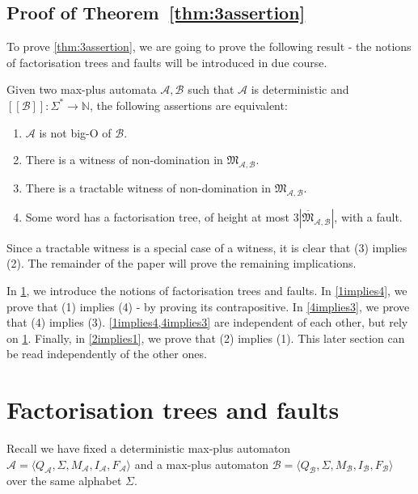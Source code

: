 \documentclass{lmcs}
\theoremstyle{remark}
\newcommand{\N}{\mathbb{N}}
\newcommand{\ideal}{\mathfrak{M}}
\newcommand{\autA}{\mathcal{A}}
\newcommand{\autB}{\mathcal{B}}
\newcommand{\brfunc}[1]{[\![#1]\!]}
\newcommand{\funcB}{\brfunc{\autB}}
\theoremstyle{remark}
\begin{document}
\subsection{Proof of Theorem~\ref{thm:3assertion}}

To prove \cref{thm:3assertion}, we are going to prove the following result - the notions of factorisation trees and faults will be introduced in due course.

\begin{thm}\label{thm:4assertion}
Given two max-plus automata $\autA,\autB$ such that $\autA$ is deterministic and $\funcB:\Sigma^* \to \N$, the following assertions are equivalent:
\begin{enumerate}[label={\normalfont(\arabic*)}]
\item $\autA$ is not big-O of $\autB$.
\item There is a witness of non-domination in $\ideal_{\autA,\autB}$.
\item There is a tractable witness of non-domination in $\ideal_{\autA,\autB}$.
\item Some word has a factorisation tree, of height at most $3|\overline{\ideal}_{\autA,\autB}|$, with a fault.
\end{enumerate}
\end{thm}

Since a tractable witness is a special case of a witness, it is clear that (3) implies (2). The remainder of the paper will prove the remaining implications. 

In \cref{section:facto-fault}, we introduce the notions of factorisation trees and faults. In \cref{1implies4}, we prove that (1) implies (4) - by proving its contrapositive. In \cref{4implies3}, we prove that (4) implies (3). \cref{1implies4,4implies3} are independent of each other, but rely on \cref{section:facto-fault}. Finally, in \cref{2implies1}, we prove that (2) implies (1). This later section can be read independently of the other ones.

\section{Factorisation trees and faults}
\label{section:facto-fault}

Recall we have fixed a deterministic max-plus automaton $\autA = \langle Q_\autA, \Sigma, M_\autA, I_\autA, F_\autA\rangle$ and a max-plus automaton $\autB = \langle Q_\autB, \Sigma, M_\autB, I_\autB, F_\autB\rangle$ over the same alphabet $\Sigma$.
\end{document}
